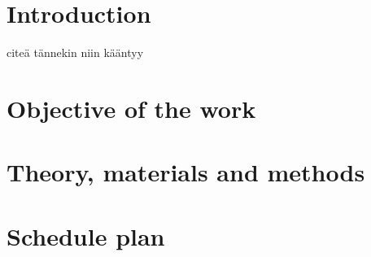 \section{Introduction}

\cite{SGP} citeä tännekin niin kääntyy

\section{Objective of the work}


\section{Theory, materials and methods}


\section{Schedule plan}


